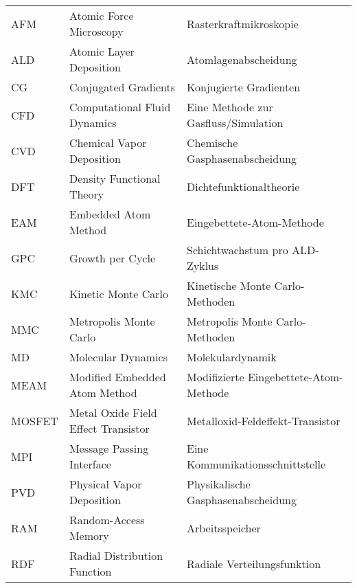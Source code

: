 \def\arraystretch{1.3}
\begin{tabular}{lll}
AFM       & Atomic Force Microscopy             & Rasterkraftmikroskopie                                     \\
ALD       & Atomic Layer Deposition             & Atomlagenabscheidung                                       \\
CG        & Conjugated Gradients                & Konjugierte Gradienten                                     \\
CFD       & Computational Fluid Dynamics        & Eine Methode zur Gasfluss/Simulation                       \\
CVD       & Chemical Vapor Deposition           & Chemische Gasphasenabscheidung                             \\
DFT       & Density Functional Theory           & Dichtefunktionaltheorie                                    \\
EAM       & Embedded Atom Method                & Eingebettete-Atom-Methode                                  \\
GPC       & Growth per Cycle                    & Schichtwachstum pro ALD-Zyklus                             \\
KMC       & Kinetic Monte Carlo                 & Kinetische Monte Carlo-Methoden                            \\
MMC       & Metropolis Monte Carlo              & Metropolis Monte Carlo-Methoden                            \\
MD        & Molecular Dynamics                  & Molekulardynamik                                           \\
MEAM      & Modified Embedded Atom Method       & Modifizierte Eingebettete-Atom-Methode                     \\
MOSFET    & Metal Oxide Field Effect Transistor & Metalloxid-Feldeffekt-Transistor                           \\
MPI       & Message Passing Interface           & Eine Kommunikationsschnittstelle                           \\
PVD       & Physical Vapor Deposition           & Physikalische Gasphasenabscheidung                         \\
RAM       & Random-Access Memory                & Arbeitsspeicher                                            \\
RDF       & Radial Distribution Function        & Radiale Verteilungsfunktion                                \\

\end{tabular}

